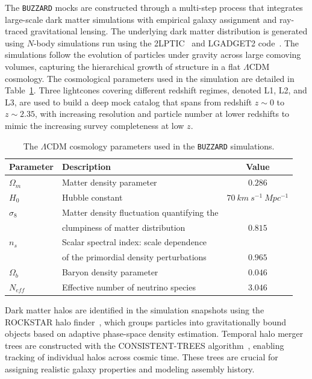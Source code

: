 The \texttt{BUZZARD} mocks are constructed through a multi-step process that integrates large-scale dark matter simulations with empirical galaxy assignment and ray-traced gravitational lensing. The underlying dark matter distribution is generated using $N$-body simulations run using the 2LPT{\small{IC}}~\citep{crocce2006transients} and LGADGET2 code~\citep{springel2005cosmological}. The simulations follow the evolution of particles under gravity across large comoving volumes, capturing the hierarchical growth of structure in a flat $\Lambda$CDM cosmology. The cosmological parameters used in the simulation are detailed in Table~\ref{tab:BUZZARD_cosmology}. Three lightcones covering different redshift regimes, denoted L1, L2, and L3, are used to build a deep mock catalog that spans from redshift $z \sim 0$ to $z \sim 2.35$, with increasing resolution and particle number at lower redshifts to mimic the increasing survey completeness at low $z$.

\begin{table}
    \small
    \centering
    \caption[\texttt{BUZZARD} cosmology]{The $\Lambda$CDM cosmology parameters used in the \texttt{BUZZARD} simulations.}
    \label{tab:BUZZARD_cosmology}
    \begin{tabular}{l l c}
        \hline
        \textbf{Parameter} & \textbf{Description} & \textbf{Value} \\
        \hline
        $\Omega_m$ & Matter density parameter & $0.286$ \\
        $H_0$ & Hubble constant & $70~{km~s^{-1}~Mpc^{-1}}$ \\
        $\sigma_8$ & Matter density fluctuation quantifying the   & \\
        & clumpiness of matter distribution & $0.815$ \\
        $n_s$ & Scalar spectral index: scale dependence & \\
        & of the primordial density perturbations & $0.965$ \\
        $\Omega_b$ & Baryon density parameter & $0.046$ \\
        $N_{eff}$ & Effective number of neutrino species & $3.046$ \\
        \hline
    \end{tabular}
\end{table}

Dark matter halos are identified in the simulation snapshots using the ROCKSTAR halo finder~\citep{behroozi2012rockstar}, which groups particles into gravitationally bound objects based on adaptive phase-space density estimation. Temporal halo merger trees are constructed with the CONSISTENT-TREES algorithm~\citep{behroozi2012gravitationally}, enabling tracking of individual halos across cosmic time. These trees are crucial for assigning realistic galaxy properties and modeling assembly history.

